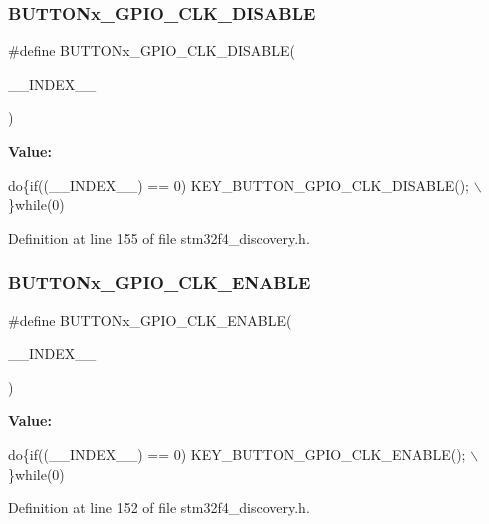 \subsubsection{\texorpdfstring{B\+U\+T\+T\+O\+Nx\+\_\+\+G\+P\+I\+O\+\_\+\+C\+L\+K\+\_\+\+D\+I\+S\+A\+B\+LE}{BUTTONx\_GPIO\_CLK\_DISABLE}}
{\footnotesize\ttfamily \#define B\+U\+T\+T\+O\+Nx\+\_\+\+G\+P\+I\+O\+\_\+\+C\+L\+K\+\_\+\+D\+I\+S\+A\+B\+LE(\begin{DoxyParamCaption}\item[{}]{\+\_\+\+\_\+\+I\+N\+D\+E\+X\+\_\+\+\_\+ }\end{DoxyParamCaption})}

{\bfseries Value\+:}
\begin{DoxyCode}
\textcolor{keywordflow}{do}\{\textcolor{keywordflow}{if}((\_\_INDEX\_\_) == 0) KEY\_BUTTON\_GPIO\_CLK\_DISABLE(); \(\backslash\)
                                                 \}\textcolor{keywordflow}{while}(0)
\end{DoxyCode}


Definition at line 155 of file stm32f4\+\_\+discovery.\+h.

\mbox{\label{group___s_t_m32_f4___d_i_s_c_o_v_e_r_y___l_o_w___l_e_v_e_l___b_u_t_t_o_n_gaa397abaece51f4d7aafb07fd79640f3e}} 
\subsubsection{\texorpdfstring{B\+U\+T\+T\+O\+Nx\+\_\+\+G\+P\+I\+O\+\_\+\+C\+L\+K\+\_\+\+E\+N\+A\+B\+LE}{BUTTONx\_GPIO\_CLK\_ENABLE}}
{\footnotesize\ttfamily \#define B\+U\+T\+T\+O\+Nx\+\_\+\+G\+P\+I\+O\+\_\+\+C\+L\+K\+\_\+\+E\+N\+A\+B\+LE(\begin{DoxyParamCaption}\item[{}]{\+\_\+\+\_\+\+I\+N\+D\+E\+X\+\_\+\+\_\+ }\end{DoxyParamCaption})}

{\bfseries Value\+:}
\begin{DoxyCode}
\textcolor{keywordflow}{do}\{\textcolor{keywordflow}{if}((\_\_INDEX\_\_) == 0) KEY\_BUTTON\_GPIO\_CLK\_ENABLE(); \(\backslash\)
                                                \}\textcolor{keywordflow}{while}(0)
\end{DoxyCode}


Definition at line 152 of file stm32f4\+\_\+discovery.\+h.

